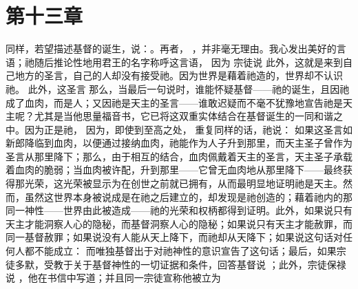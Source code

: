 
\section{第十三章}

\par

同样，若望描述基督的诞生，说：。再者， ，并非毫无理由。我心发出美好的言语；祂随后推论性地用君王的名字称呼这言语， 因为  宗徒说  此外，这就是来到自己地方的圣言，自己的人却没有接受祂。因为世界是藉着祂造的，世界却不认识祂。 此外，这圣言  那么，当最后一句说时，谁能怀疑基督——祂的诞生，且因祂成了血肉，而是人；又因祂是天主的圣言——谁敢迟疑而不毫不犹豫地宣告祂是天主呢？尤其是当他思量福音书，它已将这双重实体结合在基督诞生的一同和谐之中。因为正是祂， 因为，即使到至高之处，  重复同样的话，祂说： 如果这圣言如新郎降临到血肉，以便通过接纳血肉，祂能作为人子升到那里，而天主圣子曾作为圣言从那里降下；那么，由于相互的结合，血肉佩戴着天主的圣言，天主圣子承载着血肉的脆弱；当血肉被许配，升到那里——它曾无血肉地从那里降下——最终获得那光荣，这光荣被显示为在创世之前就已拥有，从而最明显地证明祂是天主。然而，虽然这世界本身被说成是在祂之后建立的，却发现是祂创造的；藉着祂内的那同一神性——世界由此被造成——祂的光荣和权柄都得到证明。此外，如果说只有天主才能洞察人心的隐秘，而基督洞察人心的隐秘；如果说只有天主才能赦罪，而同一基督赦罪；如果说没有人能从天上降下，而祂却从天降下；如果说这句话对任何人都不能成立：  而唯独基督出于对祂神性的意识宣告了这句话；最后，如果宗徒多默，受教于关于基督神性的一切证据和条件，回答基督说 ；此外，宗徒保禄说 ，他在书信中写道；并且同一宗徒宣称他被立为 